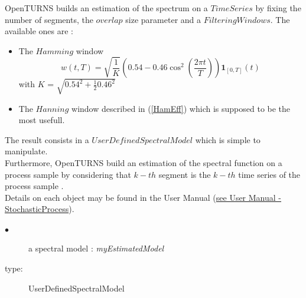 OpenTURNS builds an estimation of the spectrum on a $TimeSeries$ by fixing the number of segments, the $overlap$ size parameter and a $FilteringWindows$. The available ones are : 
\begin{itemize}
 \item The $Hamming$ window
\begin{equation}
  w(t, T) = \sqrt{\frac{1}{K}}\left(0.54-0.46\cos^2\left(\frac{2 \pi t}{T}\right)\right)\mathbf{1}_{[0,T]}(t)
\end{equation}
with $K$ = $\sqrt{0.54^2 + \frac{1}{2} 0.46^2}$
 \item The $Hanning$ window described in (\ref{HamEff}) which is supposed to be the most usefull.
\end{itemize}
The result consists in a $UserDefinedSpectralModel$ which is simple to manipulate. \\

Furthermore, OpenTURNS build an estimation of the spectral function on a process sample  by considering that $k-th$ segment is the $k-th$ time series  of the process sample .\\

Details on each object may be found in the User Manual  (\href{OpenTURNS_UserManual_TUI.pdf}{see User Manual - StochasticProcess}).\\


{

  \begin{description}
  \item[$\bullet$] a spectral model : {\itshape myEstimatedModel}
  \item[type:]  UserDefinedSpectralModel
  \end{description}

}

